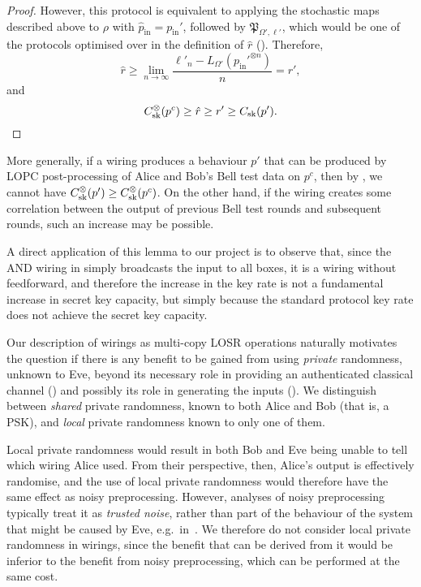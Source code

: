 \documentclass[10pt, a4paper]{article}
\numberwithin{equation}{section} %
\theoremstyle{definition}
\theoremstyle{plain}
\newcommand{\?}{\mathrel{?}} %
\newcommand{\proto}[2][\ell]{\mathfrak{P}_{#2, #1}}
\newcommand{\prin}[1][p]{#1_{\mathrm{in}}}
\newcommand{\sk}{\rm sk}
\begin{document}
\begin{proof}
                        However, this protocol is equivalent to applying the stochastic maps described above to \(\rho\) with \(\prin[\hat{p}] = \prin'\), followed by \(\proto[\ell']{\Omega'}\), which would be one of the protocols optimised over in the definition of \(\hat{r}\) (). Therefore,
                        \[ \hat{r} \geq \lim_{n\to\infty} \frac{\ell'_n - L_{\Omega'}(\prin'^{\otimes n})}{n} = r', \]
                        and
                        \[
                          C_{\sk}^{\otimes}(p^c) \geq \hat{r} \geq r' \geq C_{\sk}(p').
                        \]
                      \end{proof}

                      More generally, if a wiring produces a behaviour \(p'\) that can be produced by LOPC post-processing of Alice and Bob's Bell test data on \(p^c\), then by , we cannot have \(C_{\sk}^{\otimes}(p') \geq C_{\sk}^{\otimes}(p^c)\). On the other hand, if the wiring creates some correlation between the output of previous Bell test rounds and subsequent rounds, such an increase may be possible.

                      A direct application of this lemma to our project is to observe that, since the AND wiring in  simply broadcasts the input to all boxes, it is a wiring without feedforward, and therefore the increase in the key rate is not a fundamental increase in secret key capacity, but simply because the standard protocol key rate does not achieve the secret key capacity.

                      Our description of wirings as multi-copy LOSR operations naturally motivates the question if there is any benefit to be gained from using \emph{private} randomness, unknown to Eve, beyond its necessary role in providing an authenticated classical channel () and possibly its role in generating the inputs (). We distinguish between \emph{shared} private randomness, known to both Alice and Bob (that is, a PSK), and \emph{local} private randomness known to only one of them.

                      Local private randomness would result in both Bob and Eve being unable to tell which wiring Alice used. From their perspective, then, Alice's output is effectively randomise, and the use of local private randomness would therefore have the same effect as noisy preprocessing. However, analyses of noisy preprocessing typically treat it as \emph{trusted noise}, rather than part of the behaviour of the system that might be caused by Eve, e.g.\ in~\cite{BFF_QRE, AsymmetricCHSH, DIQKD_FiniteSize}. We therefore do not consider local private randomness in wirings, since the benefit that can be derived from it would be inferior to the benefit from noisy preprocessing, which can be performed at the same cost.
\end{document}
